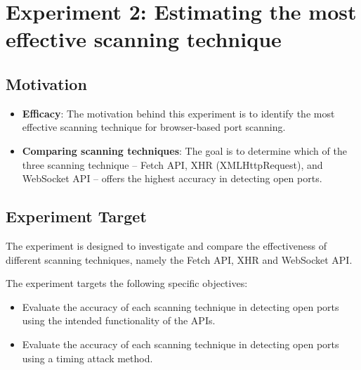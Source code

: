\section{Experiment 2: Estimating the most effective scanning technique}

\subsection{Motivation}

\begin{itemize}
    \item \textbf{Efficacy}: The motivation behind this experiment is to identify the most effective scanning technique for browser-based port scanning.
    \item \textbf{Comparing scanning techniques}: The goal is to determine which of the three scanning technique -- Fetch API, XHR (XMLHttpRequest), and WebSocket API -- offers the highest accuracy in detecting open ports.
\end{itemize}

\subsection{Experiment Target}

The experiment is designed to investigate and compare the effectiveness of different scanning techniques, namely the Fetch API, XHR and WebSocket API.

The experiment targets the following specific objectives:
\begin{itemize}
    \item Evaluate the accuracy of each scanning technique in detecting open ports using the intended functionality of the APIs.
    \item Evaluate the accuracy of each scanning technique in detecting open ports using a timing attack method.
\end{itemize}




